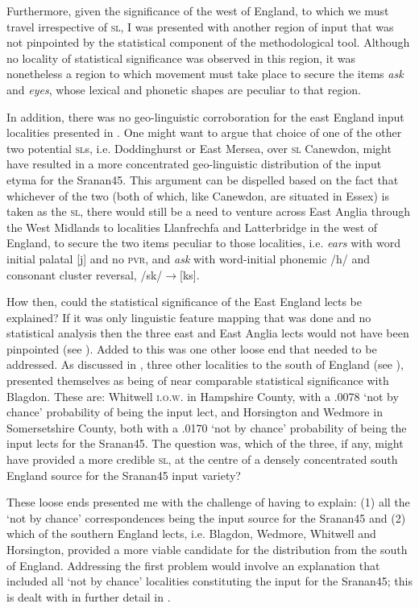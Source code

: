 Furthermore, given the significance of the west of England, to which we must travel irrespective of \textsc{sl}, I was presented with another region of input that was not pinpointed by the statistical component of the methodological tool. Although no locality of statistical significance was observed in this region, it was nonetheless a region to which movement must take place to secure the items \emph{ask} and \emph{eyes}, whose lexical and phonetic shapes are peculiar to that region.

In addition, there was no geo-linguistic corroboration for the east England input localities presented in . One might want to argue that choice of one of the other two potential \textsc{sl}s, i.e. Doddinghurst or East Mersea, over \textsc{sl} Canewdon, might have resulted in a more concentrated geo-linguistic distribution of the input etyma for the Sranan45. This argument can be dispelled based on the fact that whichever of the two (both of which, like Canewdon, are situated in Essex) is taken as the \textsc{sl}, there would still be a need to venture across East Anglia through the West Midlands to localities Llanfrechfa and Latterbridge in the west of England, to secure the two items peculiar to those localities, i.e. \emph{ears} with word initial palatal [j] and no \textsc{pvr}, and \emph{ask} with word-initial phonemic /h/ and consonant cluster reversal, /sk/$\rightarrow$[ks].

How then, could the statistical significance of the East England lects be explained? If it was only linguistic feature mapping that was done and no statistical analysis then the three east and East Anglia lects would not have been pinpointed (see ). Added to this was one other loose end that needed to be addressed. As discussed in , three other localities to the south of England (see ), presented themselves as being of near comparable statistical significance with Blagdon. These are: Whitwell \textsc{i.o.w}. in Hampshire County, with a .0078 `not by chance' probability of being the input lect, and Horsington and Wedmore in Somersetshire County, both with a .0170 `not by chance' probability of being the input lects for the Sranan45. The question was, which of the three, if any, might have provided a more credible \textsc{sl}, at the centre of a densely concentrated south England source for the Sranan45 input variety?

These loose ends presented me with the challenge of having to explain: (1) all the `not by chance' correspondences being the input source for the Sranan45 and (2) which of the southern England lects, i.e. Blagdon, Wedmore, Whitwell and Horsington, provided a more viable candidate for the distribution from the south of England. Addressing the first problem would involve an explanation that included all `not by chance' localities constituting the input for the Sranan45; this is dealt with in further detail in .

